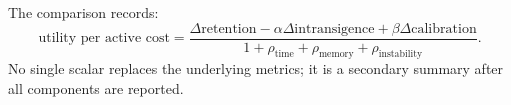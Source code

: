 The comparison records:
\begin{equation}
  \text{utility per active cost}
  = \frac{\Delta\text{retention} - \alpha\Delta\text{intransigence}
  + \beta\Delta\text{calibration}}{
  1+\rho_{\mathrm{time}}+\rho_{\mathrm{memory}}+\rho_{\mathrm{instability}}}.
  \label{eq:utility-cost}
\end{equation}
No single scalar replaces the underlying metrics; it is a secondary summary after all components are reported.

